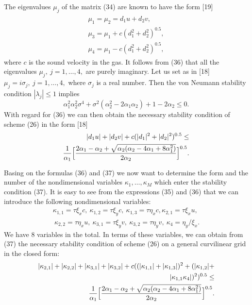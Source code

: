 The eigenvalues $\mu_j$ of the matrix (34) are known to have the form [19]
\begin{eqnarray}
\begin{array}{l}
\mu_1=\mu_2=d_1u+d_2v,\\
\mu_3=\mu_1+c(d_1^2+d_2^2)^{0.5},\\
\mu_4=\mu_1-c(d_1^2+d_2^2)^{0.5},
\end{array}
\end{eqnarray}
where $c$ is the sound velocity in the gas. It follows from (36) that all the
eigenvalues $\mu_j,~j=1,\ldots,4,$ are purely imaginary. Let us set as in [18]
$\mu_j=i\sigma_j,~j=1,\ldots,4,$ where $\sigma_j$ is a real number. Then the
von Neumann stability condition $|\lambda_j|\leq 1$ implies
$$\alpha_1^2\alpha_2^2\sigma^4 + \sigma^2(\alpha_2^2 - 2\alpha_1\alpha_2)+
1-2\alpha_2\leq 0.$$
With regard for (36) we can then obtain the necessary stability condition of
scheme (26) in the form [18]
\begin{eqnarray}
|d_1u|+|d_2v|+c(|d_1|^2+|d_2|^2)^{0.5}\leq \nonumber\\
\frac{1}{\alpha_1}\Bigl[\frac{2\alpha_1 -\alpha_2 +\sqrt{\alpha_2(\alpha_2
-4\alpha_1+8\alpha_1^2)}}{2\alpha_2}\Bigr]^{0.5}.
\end{eqnarray}

    Basing on the formulas (36) and (37) we now want to determine the form and
the number of the nondimensional variables $\kappa_1,\ldots,\kappa_M$ which
enter the stability condition (37). It is easy to see from the expressions (35)
and (36) that we can introduce the following nondimensional variables:
\begin{eqnarray}
\kappa_{1,1}=\tau\xi_x c,~\kappa_{1,2}=\tau\xi_y c,~\kappa_{1,3}=\tau\eta_x c,
\kappa_{2,1}=\tau\xi_x u,
\nonumber\\
~\kappa_{2,2}=\tau\eta_x u,~\kappa_{3,1}=\tau\xi_y v,~
\kappa_{3,2}=\tau\eta_y v,~\kappa_4=\eta_y/\xi_x.
\end{eqnarray}
We have 8 variables in the total. In terms of these variables, we can
obtain from (37) the necessary stability condition of scheme (26) on a general
curvilinear grid in the closed form:
\begin{eqnarray*}
|\kappa_{2,1}|+|\kappa_{2,2}|+|\kappa_{3,1}|+|\kappa_{3,2}|+
c((|\kappa_{1,1}|+|\kappa_{1,3}|)^2+(|\kappa_{1,2}|+\\
|\kappa_{1,1}\kappa_4|)^2)^{0.5}\leq \\
\frac{1}{\alpha_1}\Bigl[\frac{2\alpha_1 -\alpha_2 +\sqrt{\alpha_2(\alpha_2
-4\alpha_1+8\alpha_1^2)}}{2\alpha_2}\Bigr]^{0.5}.
\end{eqnarray*}


